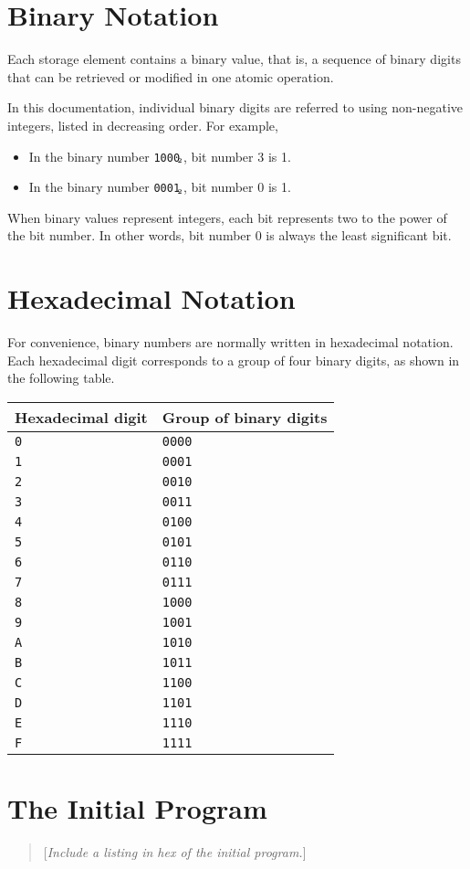 \documentclass[a4paper,11pt]{article}
\newcommand{\num}[1]{\texttt{#1}\xspace}
\newcommand{\bin}[1]{\num{#1}$_{\textup{\tiny\hskip-1ex 2}}$\xspace}
\newcommand{\comment}[1]{\begin{quote}[\textit{#1}]\end{quote}}
\begin{document}
\appendix

\section{Binary Notation}
\label{sec:binary-notation}

Each storage element contains a binary value, that is, a sequence of binary digits that can be retrieved or modified in one atomic operation.

In this documentation, individual binary digits are referred to using non-negative integers, listed in decreasing order.  For example,
\begin{itemize}
\item In the binary number \bin{1000}, bit number 3 is 1.
\item In the binary number \bin{0001}, bit number 0 is 1.
\end{itemize}

When binary values represent integers, each bit represents two to the power of the bit number.
In other words, bit number 0 is always the least significant bit.

\section{Hexadecimal Notation}
\label{sec:hexadecimal-notation}

For convenience, binary numbers are normally written in hexadecimal notation.
Each hexadecimal digit corresponds to a group of four binary digits, as shown in the following table.

\begin{center}
  \begin{tabular}{@{}ll@{}}
    \hline
    Hexadecimal digit & Group of binary digits \\
    \hline
    \num{0}           & \num{0000}   \\
    \num{1}           & \num{0001}   \\
    \num{2}           & \num{0010}   \\
    \num{3}           & \num{0011}   \\
    \num{4}           & \num{0100}   \\
    \num{5}           & \num{0101}   \\
    \num{6}           & \num{0110}   \\
    \num{7}           & \num{0111}   \\
    \num{8}           & \num{1000}   \\
    \num{9}           & \num{1001}   \\
    \num{A}           & \num{1010}   \\
    \num{B}           & \num{1011}   \\
    \num{C}           & \num{1100}   \\
    \num{D}           & \num{1101}   \\
    \num{E}           & \num{1110}   \\
    \num{F}           & \num{1111}   \\
    \hline
  \end{tabular}
\end{center}

\section{The Initial Program}
\label{sec:initial-program}

\comment{Include a listing in hex of the initial program.}
\end{document}
